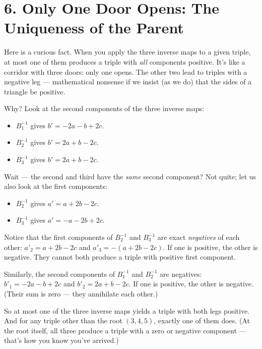 \section{6. Only One Door Opens: The Uniqueness of the Parent}\label{ch14-only-one-door-opens-the-uniqueness-of-the-parent}

Here is a curious fact. When you apply the three inverse maps to a given triple, at most one of them produces a triple with \emph{all} components positive. It's like a corridor with three doors: only one opens. The other two lead to triples with a negative leg --- mathematical nonsense if we insist (as we do) that the sides of a triangle be positive.

Why? Look at the second components of the three inverse maps:

\begin{itemize}

\item
  \(B_1^{-1}\) gives \(b' = -2a - b + 2c\).
\item
  \(B_2^{-1}\) gives \(b' = 2a + b - 2c\).
\item
  \(B_3^{-1}\) gives \(b' = 2a + b - 2c\).
\end{itemize}

Wait --- the second and third have the \emph{same} second component? Not quite; let us also look at the first components:

\begin{itemize}

\item
  \(B_2^{-1}\) gives \(a' = a + 2b - 2c\).
\item
  \(B_3^{-1}\) gives \(a' = -a - 2b + 2c\).
\end{itemize}

Notice that the first components of \(B_2^{-1}\) and \(B_3^{-1}\) are exact \emph{negatives} of each other: \(a'_2 = a + 2b - 2c\) and \(a'_3 = -(a + 2b - 2c)\). If one is positive, the other is negative. They cannot both produce a triple with positive first component.

Similarly, the second components of \(B_1^{-1}\) and \(B_2^{-1}\) are negatives: \(b'_1 = -2a - b + 2c\) and \(b'_2 = 2a + b - 2c\). If one is positive, the other is negative. (Their sum is zero --- they annihilate each other.)

So at most one of the three inverse maps yields a triple with both legs positive. And for any triple other than the root \((3, 4, 5)\), exactly one of them does. (At the root itself, all three produce a triple with a zero or negative component --- that's how you know you've arrived.)

